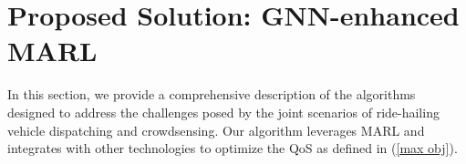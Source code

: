 
\section{Proposed Solution: GNN-enhanced MARL}

In this section, we provide a comprehensive description of the algorithms designed to address the challenges posed by the joint scenarios of ride-hailing vehicle dispatching and crowdsensing. Our algorithm leverages MARL and integrates with other technologies to optimize the QoS as defined in (\ref{max obj}). 

